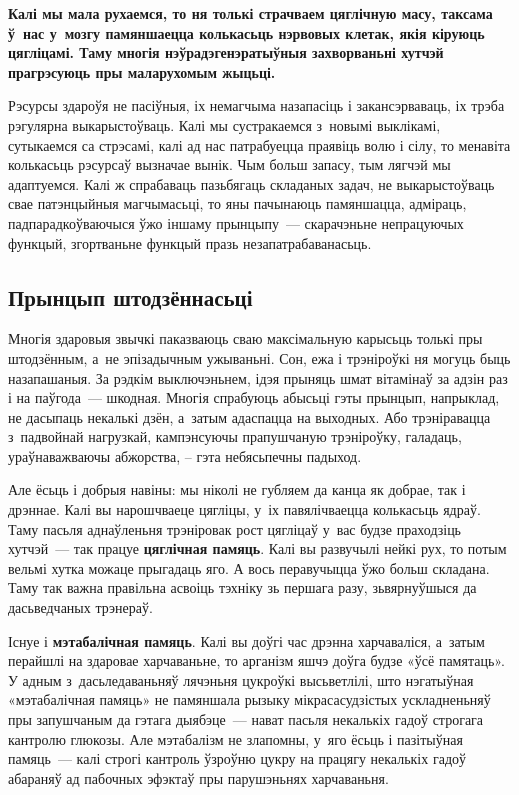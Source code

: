 \textbf{Калі мы мала рухаемся, то ня толькі страчваем цяглічную масу, таксама ў~нас у~мозгу памяншаецца колькасьць нэрвовых клетак, якія кіруюць цягліцамі. Таму многія нэўрадэгенэратыўныя захворваньні хутчэй прагрэсуюць пры маларухомым жыцьці.}

Рэсурсы здароўя не пасіўныя, іх немагчыма назапасіць і закансэрваваць, іх трэба рэгулярна выкарыстоўваць. Калі мы сустракаемся з~новымі выклікамі, сутыкаемся са стрэсамі, калі ад нас патрабуецца праявіць волю і сілу, то менавіта колькасьць рэсурсаў вызначае вынік. Чым больш запасу, тым лягчэй мы адаптуемся. Калі ж спрабаваць пазьбягаць складаных задач, не выкарыстоўваць свае патэнцыйныя магчымасьці, то яны пачынаюць памяншацца, адміраць, падпарадкоўваючыся ўжо іншаму прынцыпу~--- скарачэньне непрацуючых функцый, згортваньне функцый празь незапатрабаванасьць.

\subsection*{Прынцып штодзённасьці}

Многія здаровыя звычкі паказваюць сваю максімальную карысьць толькі пры штодзённым, а~не эпізадычным ужываньні. Сон, ежа і трэніроўкі ня могуць быць назапашаныя. За рэдкім выключэньнем, ідэя прыняць шмат вітамінаў за адзін раз і на паўгода~--- шкодная. Многія спрабуюць абысьці гэты прынцып, напрыклад, не дасыпаць некалькі дзён, а~затым адаспацца на выходных. Або трэніравацца з~падвойнай нагрузкай, кампэнсуючы прапушчаную трэніроўку, галадаць, ураўнаважваючы абжорства, -- гэта небясьпечны падыход.

Але ёсьць і добрыя навіны: мы ніколі не губляем да канца як добрае, так і дрэннае. Калі вы нарошчваеце цягліцы, у~іх павялічваецца колькасьць ядраў. Таму пасьля аднаўленьня трэніровак рост цягліцаў у~вас будзе праходзіць хутчэй~--- так працуе \textbf{цяглічная памяць}. Калі вы развучылі нейкі рух, то потым вельмі хутка можаце прыгадаць яго. А вось перавучыцца ўжо больш складана. Таму так важна правільна асвоіць тэхніку зь першага разу, зьвярнуўшыся да дасьведчаных трэнераў.

Існуе і \textbf{мэтабалічная памяць}. Калі вы доўгі час дрэнна харчаваліся, а~затым перайшлі на здаровае харчаваньне, то арганізм яшчэ доўга будзе «ўсё памятаць». У адным з~дасьледаваньняў лячэньня цукроўкі высьветлілі, што нэгатыўная «мэтабалічная памяць» не памяншала рызыку мікрасасудзістых ускладненьняў пры запушчаным да гэтага дыябэце~--- нават пасьля некалькіх гадоў строгага кантролю глюкозы. Але мэтабалізм не злапомны, у~яго ёсьць і пазітыўная памяць~--- калі строгі кантроль ўзроўню цукру на працягу некалькіх гадоў абараняў ад пабочных эфэктаў пры парушэньнях харчаваньня.


